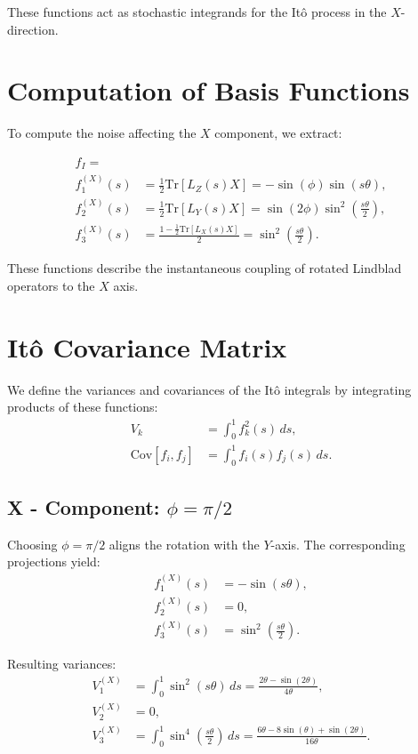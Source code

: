 \documentclass[12pt]{article}
\begin{document}
These functions act as stochastic integrands for the It\^o process in the $X$-direction.

\section*{Computation of Basis Functions}
To compute the noise affecting the $X$ component, we extract:

\begin{align}
f_I = 
\\
f_1^{(X)}(s) &= \frac{1}{2} \text{Tr}[L_Z(s) X] = -\sin(\phi) \sin(s\theta), \\
f_2^{(X)}(s) &= \frac{1}{2} \text{Tr}[L_Y(s) X] = \sin(2\phi) \sin^2\left(\frac{s\theta}{2}\right), \\
f_3^{(X)}(s) &= \frac{1 - \frac{1}{2} \text{Tr}[L_X(s) X]}{2} = \sin^2\left(\frac{s\theta}{2}\right).
\end{align}

These functions describe the instantaneous coupling of rotated Lindblad operators to the $X$ axis.

\section*{It\^o Covariance Matrix}
We define the variances and covariances of the It\^o integrals by integrating products of these functions:
\begin{align}
V_k &= \int_0^1 f_k^2(s)\, ds, \\
\text{Cov}[f_i, f_j] &= \int_0^1 f_i(s) f_j(s)\, ds.
\end{align}

\subsection*{X - Component: $\phi = \pi/2$}
Choosing $\phi = \pi/2$ aligns the rotation with the $Y$-axis. The corresponding projections yield:
\begin{align*}
f_1^{(X)}(s) &= -\sin(s\theta), \\
f_2^{(X)}(s) &= 0, \\
f_3^{(X)}(s) &= \sin^2\left(\frac{s\theta}{2}\right).
\end{align*}

Resulting variances:
\begin{align*}
V_1^{(X)} &= \int_0^1 \sin^2(s\theta)\, ds = \frac{2\theta - \sin(2\theta)}{4\theta}, \\
V_2^{(X)} &= 0, \\
V_3^{(X)} &= \int_0^1 \sin^4\left(\frac{s\theta}{2}\right)\, ds = \frac{6\theta - 8\sin(\theta) + \sin(2\theta)}{16\theta}.
\end{align*}
\end{document}
